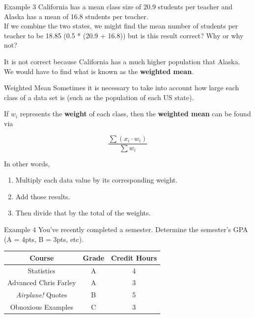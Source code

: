 \documentclass[t]{beamer}
\begin{document}
\begin{frame}{Example 3}
California has a mean class size of 20.9 students per teacher and Alaska has a mean of 16.8 students per teacher. \newline\\ 

If we combine the two states, we might find the mean number of students per teacher to be 18.85 (0.5 * (20.9 + 16.8)) but is this result correct? Why or why not?	\newline\\	\pause

It is not correct because California has a much higher population that Alaska. We would have to find what is known as the \textbf{weighted mean}.
\end{frame}

\begin{frame}{Weighted Mean}
Sometimes it is necessary to take into account how large each class of a data set is (such as the population of each US state).	\newline\\	\pause

If $w_i$ represents the {\color{blue}\textbf{weight}} of each class, then the \textbf{weighted mean} can be found via

\[\frac{\sum \left(x_i \cdot w_i\right)}{\sum w_i}\]
\vspace{8pt}	\pause

In other words, \newline\\
\begin{enumerate}
	\item Multiply each data value by its corresponding weight.	\pause
	\item Add those results.	\pause
	\item Then divide that by the total of the weights.
\end{enumerate}
\end{frame}

\begin{frame}{Example 4}
You've recently completed a semester. Determine the semester's GPA (A = 4pts, B = 3pts, etc).	\newline\\
\begin{center}
\begin{tabular}{|c|c|c|}
\textbf{Course} 			&	\textbf{Grade}	&	\textbf{Credit Hours} 	\\	\hline
Statistics					&	A 				&	4						\\
Advanced Chris Farley		&	A 				&	3						\\
\textit{Airplane!} Quotes	&	B 				&	5						\\
Obnoxious Examples			&	C 				&	3						\\
\end{tabular}
\end{center}
\end{frame}
\end{document}
